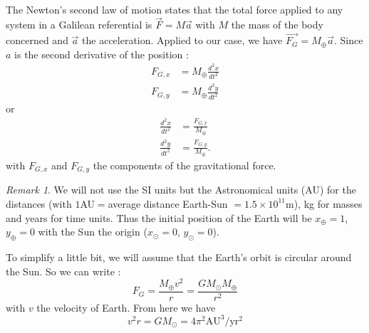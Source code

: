 \documentclass[a4paper, twoside, 11pt]{report}
\theoremstyle{theorem}
\theoremstyle{remark}
\newtheorem{remark}{Remark}[chapter]
\theoremstyle{exemple}
\begin{document}
            \paragraph{}The Newton's second law of motion states that the total force applied to any system in a Galilean referential is $\overrightarrow{F}=M\overrightarrow{a}$ with $M$ the mass of the body concerned and $\overrightarrow {a}$ the acceleration. Applied to our case, we have $\overrightarrow{{F}_{G}} = {M}_{\oplus} \overrightarrow{a}$. Since $a$ is the second derivative of the position : 
                \begin{align*}
                    F_{G,x} &= M_{\oplus} \frac{d^2 x}{dt^2} \\
                    F_{G,y} &= M_{\oplus} \frac{d^2 y}{dt^2}
                \end{align*}
            or
                \begin{align}
                    \frac{d^2 x}{dt^2} &= \frac{F_{G,x}}{M_{\oplus}} \tag{1}\\
                    \frac{d^2 y}{dt^2} &= \frac{F_{G,y}}{M_{\oplus}} \tag{2}.
                \end{align}
            with $F_{G,x}$ and $F_{G,y}$ the components of the gravitational force.\\
            \begin{remark}
            	We will not use the SI units but the Astronomical units (AU) for the distances (with $1$AU$=$average distance Earth-Sun $=1.5 \times 10^{11}$m), kg for masses and years for time units. Thus the initial position of the Earth will be $x_{\oplus} = 1$, \hspace{0,1cm}$y_{\oplus} = 0$ with the Sun the origin ($x_{\odot} = 0$, $y_{\odot} = 0$). 

			\end{remark}
            To simplify a little bit, we will assume that the Earth's orbit is circular around the Sun. So we can write :
                \begin{equation}
                    F_G = \frac{M_{\oplus} v^2}{r} = \frac{GM_{\odot}M_{\oplus}}{r^2}
                    \tag{3}
                \end{equation}
            with $v$ the velocity of Earth. From here we have
                \begin{equation*}
                    v^2 r = GM_{\odot} = 4 \pi^2 \mathrm{AU}^3 / \mathrm{yr}^2
                    \tag{4}
                \end{equation*}
            
\end{document}
